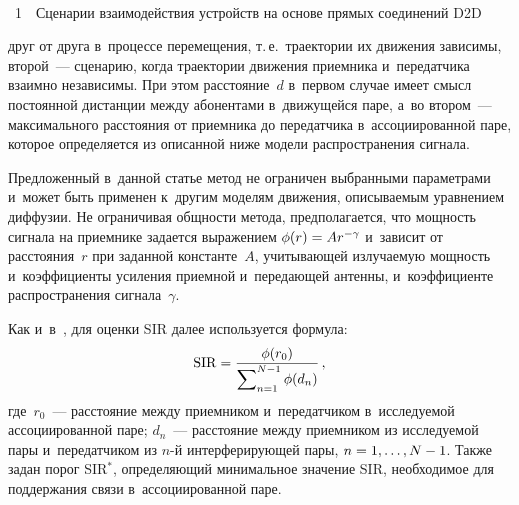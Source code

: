 \begin{multicols}{2}
 { \begin{center}  %
 \vspace*{9pt}
 \mbox{%
 \epsfxsize=77.39mm 
 }


\end{center}


\noindent
{{\figurename~1}\ \ \small{Сценарии взаимодействия устройств на основе 
прямых соединений D2D}}
}


\addtocounter{figure}{1}


\noindent
 друг от друга в~процессе перемещения, т.\,е.\ 
траектории их движения зависимы, второй~--- сценарию, когда траектории 
движения приемника и~передатчика взаимно независимы. При этом 
расстояние~$d$ в~первом случае имеет смысл постоянной дистанции между 
абонентами в~движущейся паре, а~во втором~--- максимального расстояния от 
приемника до передатчика в~ассоциированной паре, которое определяется из 
описанной ниже модели распространения сигнала. 

Предложенный в~данной 
статье метод не ограничен выбранными параметрами и~может быть применен 
к~другим моделям движения, описываемым уравнением диффузии. Не 
ограничивая общности метода, предполагается, что мощность сигнала на 
приемнике задается выражением $\phi(r)\hm=Ar^{-\gamma}$ и~зависит от 
расстояния~$r$ при заданной константе~$A$, учитывающей излучаемую 
мощность и~коэффициенты усиления приемной и~передающей антенны, 
и~коэффициенте распространения сигнала~$\gamma$. 
  
  Как и~в~\cite{14-g1}, для оценки SIR далее используется 
формула:
 $$
 \mathrm{SIR}= \displaystyle\frac{\displaystyle \phi(r_0)\mathstrut}{\displaystyle \sum\nolimits_{n=1}^{N-1} \phi(d_n)\mathstrut}\,,
 $$  
где~$r_0$~--- расстояние между приемником и~передатчиком в~исследуемой 
ассоциированной паре; $d_n$~--- расстояние между приемником из 
исследуемой пары и~передатчиком из $n$-й интерферирующей пары, 
$n\hm=1,\ldots ,N\hm-1$. Также задан порог SIR$^*$, определяющий 
минимальное значение SIR, необходимое для поддержания связи 
в~ассоциированной паре. 
  

\end{multicols}
